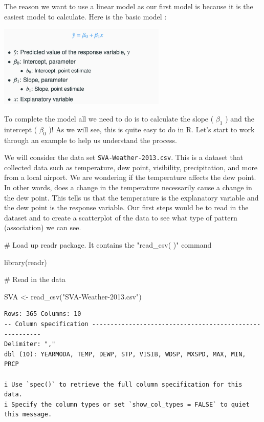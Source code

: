 \documentclass[
  letterpaper,
  DIV=11,
  numbers=noendperiod]{scrreprt}
\newenvironment{Shaded}{\begin{snugshade}}{\end{snugshade}}
\newcommand{\CommentTok}[1]{\textcolor[rgb]{0.37,0.37,0.37}{#1}}
\newcommand{\FunctionTok}[1]{\textcolor[rgb]{0.28,0.35,0.67}{#1}}
\newcommand{\NormalTok}[1]{\textcolor[rgb]{0.00,0.23,0.31}{#1}}
\newcommand{\OtherTok}[1]{\textcolor[rgb]{0.00,0.23,0.31}{#1}}
\newcommand{\StringTok}[1]{\textcolor[rgb]{0.13,0.47,0.30}{#1}}
\begin{document}
The reason we want to use a linear model as our first model is because
it is the easiest model to calculate. Here is the basic model :

\includegraphics[width=0.6\textwidth,height=\textheight]{./images/LMR_3.jpg}

To complete the model all we need to do is to calculate the slope (
\(\beta_1\) ) and the intercept ( \(\beta_0\) )! As we will see, this is
quite easy to do in R. Let's start to work through an example to help us
understand the process.

We will consider the data set \texttt{SVA-Weather-2013.csv}. This is a
dataset that collected data such as temperature, dew point, visibility,
precipitation, and more from a local airport. We are wondering if the
temperature affects the dew point. In other words, does a change in the
temperature necessarily cause a change in the dew point. This tells us
that the temperature is the explanatory variable and the dew point is
the response variable. Our first steps would be to read in the dataset
and to create a scatterplot of the data to see what type of pattern
(association) we can see.

\begin{Shaded}
\begin{Highlighting}[]
\CommentTok{\# Load up readr package. It contains the "read\_csv( )" command}

\FunctionTok{library}\NormalTok{(readr)}
\end{Highlighting}
\end{Shaded}

\begin{Shaded}
\begin{Highlighting}[]
\CommentTok{\# Read in the data}

\NormalTok{SVA }\OtherTok{\textless{}{-}} \FunctionTok{read\_csv}\NormalTok{(}\StringTok{"SVA{-}Weather{-}2013.csv"}\NormalTok{)}
\end{Highlighting}
\end{Shaded}

\begin{verbatim}
Rows: 365 Columns: 10
-- Column specification --------------------------------------------------------
Delimiter: ","
dbl (10): YEARMODA, TEMP, DEWP, STP, VISIB, WDSP, MXSPD, MAX, MIN, PRCP

i Use `spec()` to retrieve the full column specification for this data.
i Specify the column types or set `show_col_types = FALSE` to quiet this message.
\end{verbatim}
\end{document}
